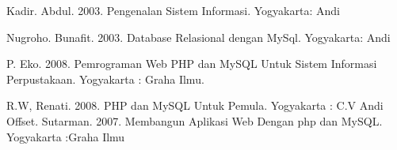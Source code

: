 \documentclass{jtetiproposalskripsi}
\begin{document}

\begin{thebibliography}{9}
Kadir. Abdul. 2003. Pengenalan Sistem Informasi. Yogyakarta: Andi

Nugroho. Bunafit. 2003. Database Relasional dengan MySql. Yogyakarta: Andi 

P. Eko. 2008. Pemrograman Web PHP dan MySQL Untuk Sistem Informasi Perpustakaan. Yogyakarta : Graha Ilmu. 

R.W, Renati. 2008. PHP dan MySQL Untuk Pemula. Yogyakarta : C.V Andi Offset. 
Sutarman. 2007. Membangun Aplikasi Web Dengan php dan MySQL. Yogyakarta :Graha Ilmu



\end{thebibliography}
\end{document}
